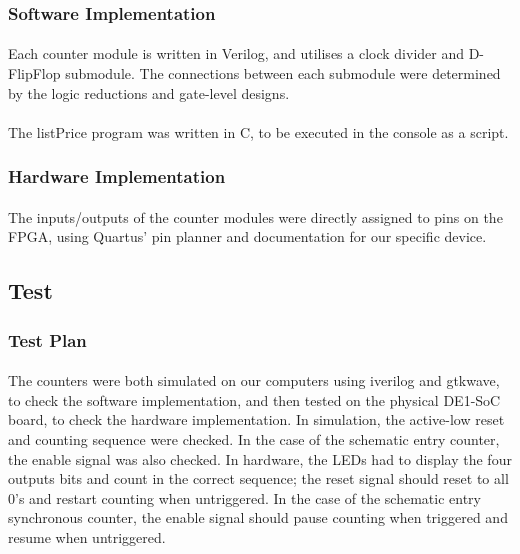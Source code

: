 \documentclass{article}
\begin{document}
	  \subsubsection{Software Implementation}
	  	\paragraph{} Each counter module is written in Verilog, and utilises a clock divider and D-FlipFlop submodule. The connections between each submodule were determined by the logic reductions and gate-level designs.

	  	\paragraph{} The listPrice program was written in C, to be executed in the console as a script.

	  \subsubsection{Hardware Implementation}
	  	\paragraph{} The inputs/outputs of the counter modules were directly assigned to pins on the FPGA, using Quartus' pin planner and documentation for our specific device.

  \subsection{Test}
	  \subsubsection{Test Plan}
	  	\paragraph{} The counters were both simulated on our computers using iverilog and gtkwave, to check the software implementation, and then tested on the physical DE1-SoC board, to check the hardware implementation. In simulation, the active-low reset and counting sequence were checked. In the case of the schematic entry counter, the enable signal was also checked. In hardware, the LEDs had to display the four outputs bits and count in the correct sequence; the reset signal should reset to all 0's and restart counting when untriggered. In the case of the schematic entry synchronous counter, the enable signal should pause counting when triggered and resume when untriggered.
\end{document}
